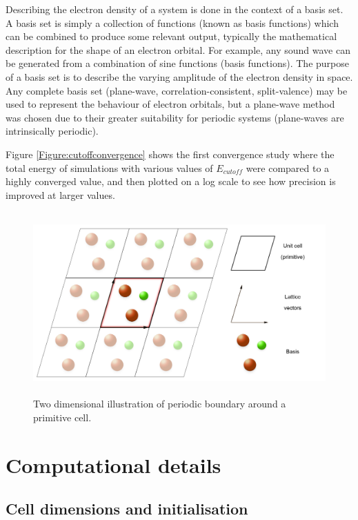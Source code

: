 Describing the electron density of a system is done in the context of a basis set. A basis set is simply a collection of functions (known as basis functions) which can be combined to produce some relevant output, typically the mathematical description for the shape of an electron orbital. For example, any sound wave can be generated from a combination of sine functions (basis functions). The purpose of a basis set is to describe the varying amplitude of the electron density in space. Any complete basis set (plane-wave, correlation-consistent, split-valence) may be used to represent the behaviour of electron orbitals, but a plane-wave method was chosen due to their greater suitability for periodic systems (plane-waves are intrinsically periodic). 

Figure \ref{Figure:cutoffconvergence} shows the first convergence study where the total energy of simulations with various values of $E_{cutoff}$ were compared to a highly converged value, and then plotted on a log scale to see how precision is improved at larger values.

\begin{figure} %
\label{figure:periodicboundary}
\begin{center}
\includegraphics[height=7cm]{images/PeriodicBoundaryThesis.png}
\end{center}
\caption{Two dimensional illustration of periodic boundary around a primitive cell.}
\end{figure}


\section{Computational details}
\subsection{Cell dimensions and initialisation}

